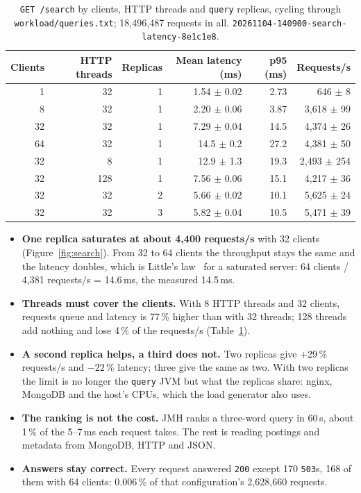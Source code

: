 \documentclass[11pt,a4paper]{article}
\newcommand{\code}[1]{\nolinkurl{#1}}
\newcommand{\run}[1]{\nolinkurl{#1}}
\begin{document}
\begin{table}[ht]
\centering
\small
\caption{\code{GET /search} by clients, HTTP threads and \code{query} replicas, cycling through
\code{workload/queries.txt}; 18{,}496{,}487 requests in all. \run{20261104-140900-search-latency-8e1c1e8}.}
\label{tab:search-latency}
\begin{tabular}{@{}rrrrrr@{}}
\toprule
Clients & HTTP threads & Replicas & Mean latency (ms) & p95 (ms) & Requests/s \\
\midrule
1 & 32 & 1 & 1.54 $\pm$ 0.02 & 2.73 & 646 $\pm$ 8 \\
8 & 32 & 1 & 2.20 $\pm$ 0.06 & 3.87 & 3{,}618 $\pm$ 99 \\
32 & 32 & 1 & 7.29 $\pm$ 0.04 & 14.5 & 4{,}374 $\pm$ 26 \\
64 & 32 & 1 & 14.5 $\pm$ 0.2 & 27.2 & 4{,}381 $\pm$ 50 \\
32 & 8 & 1 & 12.9 $\pm$ 1.3 & 19.3 & 2{,}493 $\pm$ 254 \\
32 & 128 & 1 & 7.56 $\pm$ 0.06 & 15.1 & 4{,}217 $\pm$ 36 \\
32 & 32 & 2 & 5.66 $\pm$ 0.02 & 10.1 & 5{,}625 $\pm$ 24 \\
32 & 32 & 3 & 5.82 $\pm$ 0.04 & 10.5 & 5{,}471 $\pm$ 39 \\
\bottomrule
\end{tabular}
\end{table}

\begin{itemize}
\item \textbf{One replica saturates at about 4{,}400 requests/s} with 32 clients (Figure~\ref{fig:search}). From 32
  to 64 clients the throughput stays the same and the latency doubles, which is Little's law~\cite{little} for a saturated server:
  64 clients / 4{,}381 requests/s = 14.6\,ms, the measured 14.5\,ms.
\item \textbf{Threads must cover the clients.} With 8 HTTP threads and 32 clients, requests queue and latency is
  77\,\% higher than with 32 threads; 128 threads add nothing and lose 4\,\% of the requests/s
  (Table~\ref{tab:search-latency}).
\item \textbf{A second replica helps, a third does not.} Two replicas give +29\,\% requests/s and $-22$\,\% latency;
  three give the same as two. With two replicas the limit is no longer the \code{query} JVM but what the replicas
  share: nginx, MongoDB and the host's CPUs, which the load generator also uses.
\item \textbf{The ranking is not the cost.} JMH ranks a three-word query in 60\,\textmu s, about 1\,\% of the 5--7\,ms
  each request takes. The rest is reading postings and metadata from MongoDB, HTTP and JSON.
\item \textbf{Answers stay correct.} Every request answered \code{200} except 170 \code{503}s, 168 of them with 64
  clients: 0.006\,\% of that configuration's 2{,}628{,}660 requests.
\end{itemize}
\end{document}
